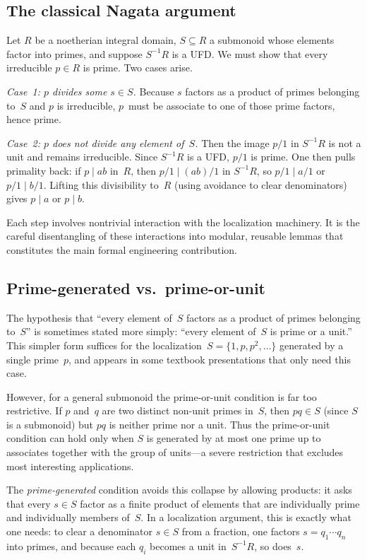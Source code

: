\documentclass[11pt]{article}
\theoremstyle{plain}
\theoremstyle{definition}
\theoremstyle{remark}
\begin{document}
\subsection{The classical Nagata argument}\label{sec:classical}

Let $R$ be a noetherian integral domain, $S\subseteq R$ a submonoid whose
elements factor into primes, and suppose $S^{-1}R$ is a UFD.  We must show
that every irreducible $p\in R$ is prime.  Two cases arise.

\emph{Case~1: $p$ divides some $s\in S$.}  Because $s$ factors as a product
of primes belonging to~$S$ and $p$ is irreducible, $p$~must be associate to
one of those prime factors, hence prime.

\emph{Case~2: $p$ does not divide any element of~$S$.}  Then the image $p/1$
in $S^{-1}R$ is not a unit and remains irreducible.  Since $S^{-1}R$ is a UFD,
$p/1$ is prime.  One then pulls primality back: if $p\mid ab$ in~$R$, then
$p/1\mid (ab)/1$ in $S^{-1}R$, so $p/1\mid a/1$ or $p/1\mid b/1$.  Lifting
this divisibility to~$R$ (using avoidance to clear denominators) gives
$p\mid a$ or $p\mid b$.

Each step involves nontrivial interaction with the localization machinery.  It
is the careful disentangling of these interactions into modular, reusable
lemmas that constitutes the main formal engineering contribution.

\subsection{Prime-generated vs.\ prime-or-unit}\label{sec:degeneracy}

The hypothesis that ``every element of~$S$ factors as a product of primes
belonging to~$S$'' is sometimes stated more simply: ``every element of~$S$ is
prime or a unit.''  This simpler form suffices for the
localization~$S=\{1,p,p^2,\ldots\}$ generated by a single prime~$p$, and
appears in some textbook presentations that only need this case.

However, for a general submonoid the prime-or-unit condition is far too
restrictive.  If $p$ and~$q$ are two distinct non-unit primes in~$S$, then
$pq\in S$ (since $S$ is a submonoid) but $pq$ is neither prime nor a unit.
Thus the prime-or-unit condition can hold only when $S$ is generated by at
most one prime up to associates together with the group of units---a severe
restriction that excludes most interesting applications.

The \emph{prime-generated} condition avoids this collapse by allowing products:
it asks that every $s\in S$ factor as a finite product of elements that are
individually prime and individually members of~$S$.  In a localization
argument, this is exactly what one needs: to clear a denominator $s\in S$ from
a fraction, one factors $s=q_1\cdots q_n$ into primes, and because each $q_i$
becomes a unit in~$S^{-1}R$, so does~$s$.
\end{document}
